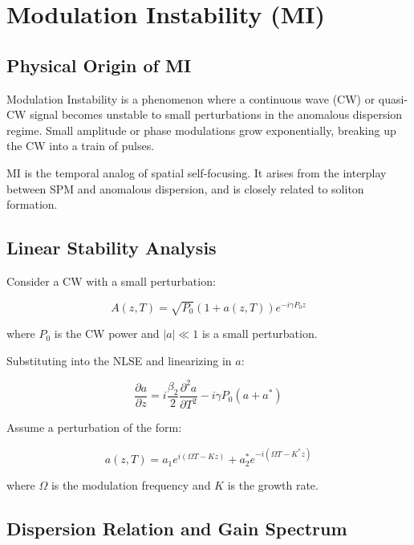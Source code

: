 \documentclass[a4paper, 11pt]{article}
\begin{document}
\section{Modulation Instability (MI)}

\subsection{Physical Origin of MI}

Modulation Instability is a phenomenon where a continuous wave (CW) or quasi-CW signal becomes unstable to small perturbations in the anomalous dispersion regime. Small amplitude or phase modulations grow exponentially, breaking up the CW into a train of pulses.

\begin{keypoint}
MI is the temporal analog of spatial self-focusing. It arises from the interplay between SPM and anomalous dispersion, and is closely related to soliton formation.
\end{keypoint}

\subsection{Linear Stability Analysis}

Consider a CW with a small perturbation:

\begin{equation}
    A(z,T) = \sqrt{P_0}(1 + a(z,T))e^{-i\gamma P_0 z}
    \label{eq:mi_ansatz}
\end{equation}

where $P_0$ is the CW power and $|a| \ll 1$ is a small perturbation.

Substituting into the NLSE and linearizing in $a$:

\begin{equation}
    \frac{\partial a}{\partial z} = i\frac{\beta_2}{2}\frac{\partial^2 a}{\partial T^2} - i\gamma P_0(a + a^*)
    \label{eq:mi_linearized}
\end{equation}

Assume a perturbation of the form:

\begin{equation}
    a(z,T) = a_1 e^{i(\Omega T - Kz)} + a_2^* e^{-i(\Omega T - K^*z)}
    \label{eq:mi_perturbation}
\end{equation}

where $\Omega$ is the modulation frequency and $K$ is the growth rate.

\subsection{Dispersion Relation and Gain Spectrum}
\end{document}
